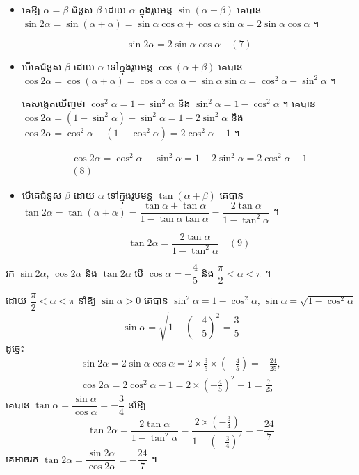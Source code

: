 \begin{itemize}
  \item គេឱ្យ $\alpha = \beta$ ជំនួស $\beta$ ដោយ $\alpha$ ក្នុងរូបមន្ត $\sin(\alpha + \beta)$ គេបាន $\sin 2\alpha = \sin(\alpha + \alpha) = \sin\alpha\cos\alpha + \cos\alpha\sin\alpha = 2\sin\alpha\cos\alpha$ ។
  \begin{formulaBox}[ដូច្នេះ]
  \[ \sin 2\alpha = 2\sin\alpha\cos\alpha \quad (7) \]
  \end{formulaBox}
  \item បើគេជំនួស $\beta$ ដោយ $\alpha$ ទៅក្នុងរូបមន្ត $\cos(\alpha + \beta)$ គេបាន $\cos 2\alpha = \cos(\alpha + \alpha) = \cos\alpha\cos\alpha - \sin\alpha\sin\alpha = \cos^2\alpha - \sin^2\alpha$ ។

  គេសង្កេតឃើញថា $\cos^2\alpha = 1 - \sin^2\alpha$ និង $\sin^2\alpha = 1 - \cos^2\alpha$ ។ គេបាន $\cos 2\alpha = (1 - \sin^2\alpha) - \sin^2\alpha = 1 - 2\sin^2\alpha$ និង $\cos 2\alpha = \cos^2\alpha - (1 - \cos^2\alpha) = 2\cos^2\alpha - 1$ ។
  \begin{formulaBox}[ដូច្នេះ]
  \[
\begin{gathered}
\cos 2\alpha = \cos^2\alpha - \sin^2\alpha = 1 - 2\sin^2\alpha = 2\cos^2\alpha - 1\\
(8)
\end{gathered}
\]
  \end{formulaBox}
  \item បើគេជំនួស $\beta$ ដោយ $\alpha$ ទៅក្នុងរូបមន្ត $\tan(\alpha + \beta)$ គេបាន $\tan 2\alpha = \tan(\alpha + \alpha) = \dfrac{\tan\alpha + \tan\alpha}{1 - \tan\alpha\tan\alpha} = \dfrac{2\tan\alpha}{1 - \tan^2\alpha}$ ។
  \begin{formulaBox}[ដូច្នេះ]
  \[ \tan 2\alpha = \frac{2\tan\alpha}{1 - \tan^2\alpha} \quad (9) \]
  \end{formulaBox}
\end{itemize}

\begin{example}[ឧទាហរណ៍ ៨]
រក $\sin 2\alpha$, $\cos 2\alpha$ និង $\tan 2\alpha$ បើ $\cos\alpha = -\dfrac{4}{5}$ និង $\dfrac{\pi}{2} < \alpha < \pi$ ។

ដោយ $\dfrac{\pi}{2} < \alpha < \pi$ នាំឱ្យ $\sin\alpha > 0$ គេបាន $\sin^2\alpha = 1 - \cos^2\alpha$, $\sin\alpha = \sqrt{1 - \cos^2\alpha}$
\[ \sin\alpha = \sqrt{1 - \left(-\frac{4}{5}\right)^2} = \frac{3}{5} \]
ដូច្នេះ
\[
\begin{gathered}
\sin 2\alpha = 2\sin\alpha\cos\alpha = 2 \times \frac{3}{5} \times \left(-\frac{4}{5}\right) = -\frac{24}{25},\\
\cos 2\alpha = 2\cos^2\alpha - 1 = 2 \times \left(-\frac{4}{5}\right)^2 - 1 = \frac{7}{25}
\end{gathered}
\]
គេបាន $\tan\alpha = \dfrac{\sin\alpha}{\cos\alpha} = -\dfrac{3}{4}$ នាំឱ្យ
\[ \tan 2\alpha = \frac{2\tan\alpha}{1 - \tan^2\alpha} = \frac{2 \times \left(-\frac{3}{4}\right)}{1 - \left(-\frac{3}{4}\right)^2} = -\frac{24}{7} \]
គេអាចរក $\tan 2\alpha = \dfrac{\sin 2\alpha}{\cos 2\alpha} = -\dfrac{24}{7}$ ។
\end{example}


